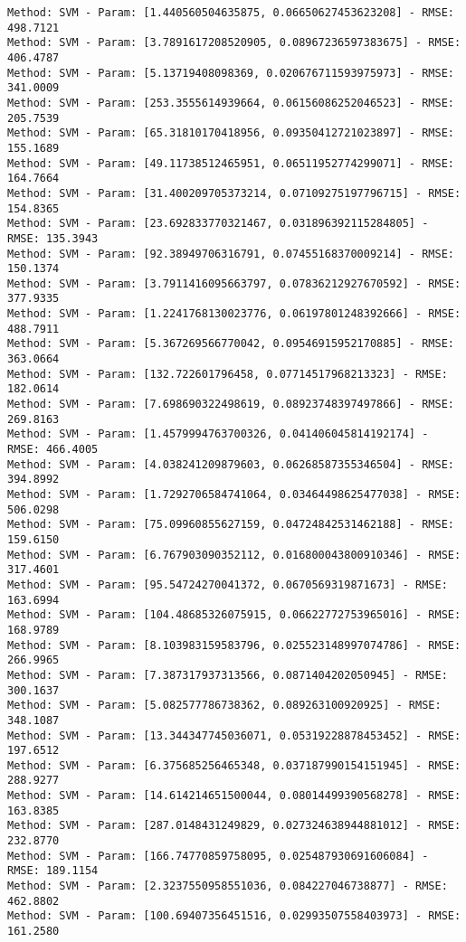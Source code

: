 \documentclass[11pt]{article}
\begin{document}
    \begin{Verbatim}[commandchars=\\\{\},fontsize=\small]
Method: SVM - Param: [1.440560504635875, 0.06650627453623208] - RMSE: 498.7121
Method: SVM - Param: [3.7891617208520905, 0.08967236597383675] - RMSE: 406.4787
Method: SVM - Param: [5.13719408098369, 0.020676711593975973] - RMSE: 341.0009
Method: SVM - Param: [253.3555614939664, 0.06156086252046523] - RMSE: 205.7539
Method: SVM - Param: [65.31810170418956, 0.09350412721023897] - RMSE: 155.1689
Method: SVM - Param: [49.11738512465951, 0.06511952774299071] - RMSE: 164.7664
Method: SVM - Param: [31.400209705373214, 0.07109275197796715] - RMSE: 154.8365
Method: SVM - Param: [23.692833770321467, 0.031896392115284805] - RMSE: 135.3943
Method: SVM - Param: [92.38949706316791, 0.07455168370009214] - RMSE: 150.1374
Method: SVM - Param: [3.7911416095663797, 0.07836212927670592] - RMSE: 377.9335
Method: SVM - Param: [1.2241768130023776, 0.06197801248392666] - RMSE: 488.7911
Method: SVM - Param: [5.367269566770042, 0.09546915952170885] - RMSE: 363.0664
Method: SVM - Param: [132.722601796458, 0.07714517968213323] - RMSE: 182.0614
Method: SVM - Param: [7.698690322498619, 0.08923748397497866] - RMSE: 269.8163
Method: SVM - Param: [1.4579994763700326, 0.041406045814192174] - RMSE: 466.4005
Method: SVM - Param: [4.038241209879603, 0.06268587355346504] - RMSE: 394.8992
Method: SVM - Param: [1.7292706584741064, 0.03464498625477038] - RMSE: 506.0298
Method: SVM - Param: [75.09960855627159, 0.04724842531462188] - RMSE: 159.6150
Method: SVM - Param: [6.767903090352112, 0.016800043800910346] - RMSE: 317.4601
Method: SVM - Param: [95.54724270041372, 0.0670569319871673] - RMSE: 163.6994
Method: SVM - Param: [104.48685326075915, 0.06622772753965016] - RMSE: 168.9789
Method: SVM - Param: [8.103983159583796, 0.025523148997074786] - RMSE: 266.9965
Method: SVM - Param: [7.387317937313566, 0.0871404202050945] - RMSE: 300.1637
Method: SVM - Param: [5.082577786738362, 0.089263100920925] - RMSE: 348.1087
Method: SVM - Param: [13.344347745036071, 0.05319228878453452] - RMSE: 197.6512
Method: SVM - Param: [6.375685256465348, 0.037187990154151945] - RMSE: 288.9277
Method: SVM - Param: [14.614214651500044, 0.08014499390568278] - RMSE: 163.8385
Method: SVM - Param: [287.0148431249829, 0.027324638944881012] - RMSE: 232.8770
Method: SVM - Param: [166.74770859758095, 0.025487930691606084] - RMSE: 189.1154
Method: SVM - Param: [2.3237550958551036, 0.084227046738877] - RMSE: 462.8802
Method: SVM - Param: [100.69407356451516, 0.02993507558403973] - RMSE: 161.2580

\end{Verbatim}
\end{document}
